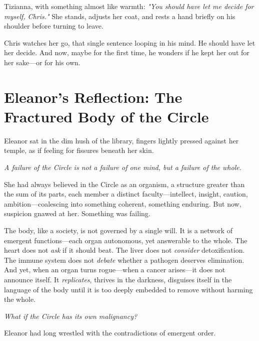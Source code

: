 \smallskip

{Tizianna}, with something almost like warmth: \textit{"You should have let me decide for myself, Chris."} She stands, adjusts her coat, and rests a hand briefly on his shoulder before turning to leave.

\smallskip

Chris watches her go, that single sentence looping in his mind. He should have let her decide. And now, maybe for the first time, he wonders if he kept her out for her sake—or for his own.


\section*{Eleanor's Reflection: The Fractured Body of the Circle}

Eleanor sat in the dim hush of the library, fingers lightly pressed against her temple, as if feeling for fissures beneath her skin.  

\smallskip

\textit{A failure of the Circle is not a failure of one mind, but a failure of the whole.}  

\smallskip

She had always believed in the Circle as an organism, a structure greater than the sum of its parts, each member a distinct faculty—intellect, insight, caution, ambition—coalescing into something coherent, something enduring. But now, suspicion gnawed at her.  Something was failing.  

\smallskip

The body, like a society, is not governed by a single will. It is a network of emergent functions—each organ autonomous, yet answerable to the whole. The heart does not \textit{ask} if it should beat. The liver does not \textit{consider} detoxification. The immune system does not \textit{debate} whether a pathogen deserves elimination. And yet, when an organ turns rogue—when a cancer arises—it does not announce itself. It \textit{replicates}, thrives in the darkness, disguises itself in the language of the body until it is too deeply embedded to remove without harming the whole.  

\smallskip

\textit{What if the Circle has its own malignancy?}  

\smallskip

Eleanor had long wrestled with the contradictions of emergent order.  

